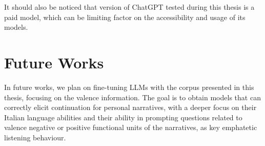 It should also be noticed that version of ChatGPT tested during this thesis is a paid model, which can be limiting factor on the accessibility and usage of its models.


\section{Future Works}
In future works, we plan on fine-tuning LLMs with the corpus presented in this thesis, focusing on the valence information. The goal is to obtain models that can correctly elicit continuation for personal narratives, with a deeper focus on their Italian language abilities and their ability in prompting questions related to valence negative or positive functional units of the narratives, as key emphatetic listening behaviour.
